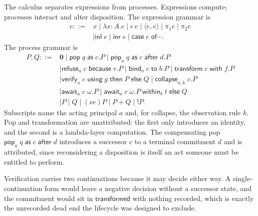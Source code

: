 \documentclass[11pt,openany]{book}
\theoremstyle{remark}
\begin{document}
The calculus separates expressions from processes. Expressions compute;
processes interact and alter disposition. The expression grammar is
\[
\begin{aligned}
e ::= {}& x \mid \lambda x{:}A.e \mid e\,e
\mid \langle e,e\rangle \mid \pi_1 e \mid \pi_2 e\\
&\mid \mathsf{inl}\;e \mid \mathsf{inr}\;e
\mid \mathsf{case}\;e\;\mathsf{of}\cdots .
\end{aligned}
\]
The process grammar is
\[
\begin{aligned}
P,Q ::= {}& \mathbf 0
\mid \mathsf{pop}\;q\;\mathsf{as}\;c.P
\mid \mathsf{pop}_a\;q\;\mathsf{as}\;c\;\mathsf{after}\;d.P\\
&\mid \mathsf{refuse}_a\;c\;\mathsf{because}\;r.P
\mid \mathsf{bind}_a\;c\;\mathsf{to}\;b.P
\mid \mathsf{transform}\;c\;\mathsf{with}\;f.P\\
&\mid \mathsf{verify}_a\;c\;\mathsf{using}\;g\;\mathsf{then}\;P\;
\mathsf{else}\;Q
\mid \mathsf{collapse}_{a,k}\;c.P\\
&\mid \mathsf{await}_a\;c\;\omega.P
\mid \mathsf{await}_a\;c\;\omega.P\;\mathsf{within}_{b}\;t\;\mathsf{else}\;Q\\
&\mid P\mid Q \mid (\nu c)P \mid P+Q \mid !P.
\end{aligned}
\]
Subscripts name the acting principal $a$ and, for collapse, the
observation rule $k$. Pop and transformation are unattributed: the first
only introduces an identity, and the second is a lambda-layer computation.
The compensating pop $\mathsf{pop}_a\;q\;\mathsf{as}\;c\;\mathsf{after}\;d$
introduces a successor $c$ to a terminal commitment $d$ and is attributed,
since reconsidering a disposition is itself an act someone must be
entitled to perform.

Verification carries two continuations because it may decide either way.
A single-continuation form would leave a negative decision without a
successor state, and the commitment would sit in $\mathsf{transformed}$
with nothing recorded, which is exactly the unrecorded dead end the
lifecycle was designed to exclude.
\end{document}
